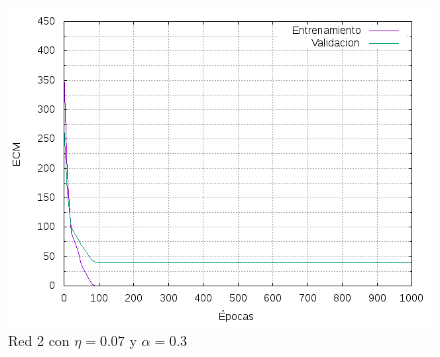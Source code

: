 \begin{figure}[H]
  \includegraphics[width=125mm]{imagenes/ej1/ex_2-4_red_11-21-1_errors.png}
  \caption{Red 2 con $\eta = 0.07 $ y $ \alpha = 0.3$}
\end{figure}




%

